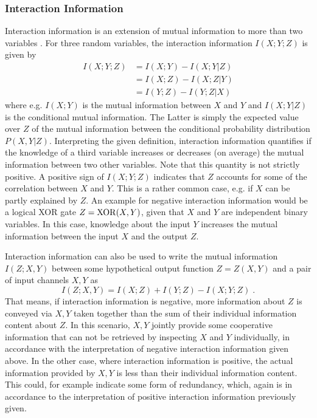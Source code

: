 \documentclass[10pt,a4paper,draft]{article}
\begin{document}
\subsubsection{Interaction Information}
Interaction information is an extension of mutual information to more than two variables \cite{McGill_1954}. For three random variables, the interaction information $I(X;Y;Z)$ is given by
\begin{align}
I(X;Y;Z) &= I(X;Y) - I(X;Y|Z) \\
		&= I(X;Z) - I(X;Z|Y) \\
		&= I(Y;Z) - I(Y;Z|X)
\end{align}
where e.g. $I(X ; Y)$ is the mutual information between $X$ and $Y$ and $I(X;Y|Z)$ is the conditional mutual information. The Latter is simply the expected value over $Z$ of the mutual information between the conditional probability distribution $P(X,Y|Z)$. Interpreting the given definition, interaction information quantifies if the knowledge of a third variable increases or decreases (on average) the mutual information between two other variables. Note that this quantity is not strictly positive. A positive sign of $I(X;Y;Z)$ indicates that $Z$ accounts for some of the correlation between $X$ and $Y$. This is a rather common case, e.g. if $X$ can be partly explained by $Z$. An example for negative interaction information would be a logical XOR gate $Z={\rm XOR}(X,Y)$, given that $X$ and $Y$ are independent binary variables. In this case, knowledge about the input $Y$ increases the mutual information between the input $X$ and the output $Z$.

Interaction information can also be used to write the mutual information $I(Z;X,Y)$ between some hypothetical output function $Z=Z(X,Y)$ and a pair of input channels $X,Y$ as
\begin{equation}
	I(Z;X,Y) = I(X;Z) + I(Y;Z) - I(X;Y;Z) \; .
\end{equation}
That means, if interaction information is negative, more information about $Z$ is conveyed via $X,Y$ taken together than the sum of their individual information content about $Z$. In this scenario, $X,Y$ jointly provide some cooperative information that can not be retrieved by inspecting $X$ and $Y$ individually, in accordance with the interpretation of negative interaction information given above. In the other case, where interaction information is positive, the actual information provided by $X,Y$ is less than their individual information content. This could, for example indicate some form of redundancy, which, again is in accordance to the interpretation of positive interaction information previously given.
\end{document}
